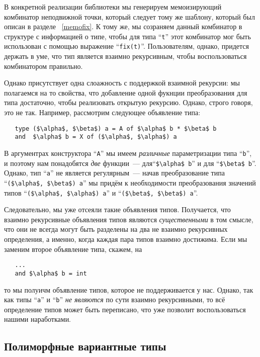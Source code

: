 В конкретной реализации библиотеки мы генерируем мемоизирующий комбинатор неподвижной точки, который следует тому же шаблону, который был описан в разделе ~\ref{memofix}. К тому же, мы созраняем данный комбинатор в структуре с информацией о типе, чтобы для 
типа ``\lstinline{t}'' этот комбинатор мог быть использован с помощью выражение 
``\lstinline{fix(t)}''. Пользователям, однако, придется держать в уме, что тип является взаимно рекурсивным, чтобы воспользоваться комбинатором правильно.

Однако присутствует одна слоажность с поддержкой взаимной рекурсии: мы полагаемся на то свойства, что добавление одной фукнции преобразования для типа  достаточно, чтобы реализовать открытую рекурсию. Однако, строго говоря, это не так. Например, рассмотрим следующее объявление типа:

\begin{lstlisting}
   type ($\alpha$, $\beta$) a = A of $\alpha$ b * $\beta$ b
   and  $\alpha$ b = X of ($\alpha$, $\alpha$) a
\end{lstlisting}

В аргументрах конструктора ``\lstinline{A}'' мы имеем \emph{различные} параметризации типа ``\lstinline{b}'', и поэтому нам понадобятся \emph{две} функции~--- для``\lstinline{$\alpha$ b}'' и для ``\lstinline{$\beta$ b}''. Однако, тип ``\lstinline{a}'' не является регулярным~--- начав преобразование типа ``\lstinline{($\alpha$, $\beta$) a}'' мы придём к необходимости преобразования значений типов ``\lstinline{($\alpha$, $\alpha$) a}'' и ``\lstinline{($\beta$, $\beta$) a}''.

Следовательно, мы уже отсеяли такие объявления типов. Получается, что взаимно рекурсивные объявления типов являются \emph{существенными} в том смысле, что они не всегда могут быть разделены на два не взаимно рекурсивных определения, а именно, когда каждая пара типов взаимно достижима. Если мы заменим второе объявление типа, скажем, на

\begin{lstlisting}
   ...
   and $\alpha$ b = int
\end{lstlisting}

то мы полуичм объявление типов, которое не поддерживается у нас. Однако, так как типы ``\lstinline{a}'' и ``\lstinline{b}''  \emph{не являются}
по сути взаимно рекурсивными, то всё определение типов может быть переписано, что уже позволит воспользоваться нашими наработками.


\subsection{Полиморфные вариантные типы}
\label{pv}

